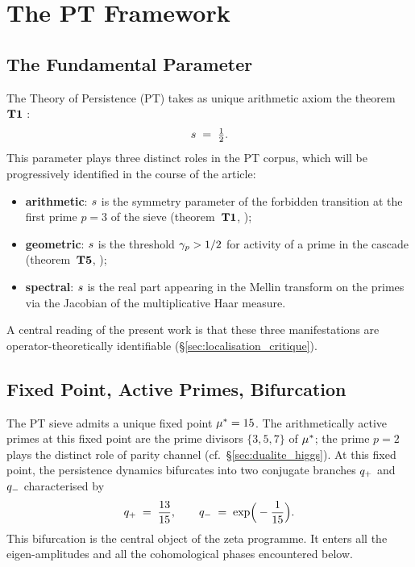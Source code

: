 \section{The PT Framework}
\label{sec:cadre_pt}

\subsection{The Fundamental Parameter}
\label{sec:parametre}

The Theory of Persistence (PT) takes as unique arithmetic axiom the
theorem~$\textbf{T1}$ \cite{PT_M1}:
\[
s \;=\; \tfrac{1}{2}.
\]
This parameter plays three distinct roles in the PT corpus, which will be
progressively identified in the course of the article:
\begin{itemize}[nosep,leftmargin=*]
\item \textbf{arithmetic}: $s$ is the symmetry parameter of the
  forbidden transition at the first prime $p = 3$ of the sieve
  (theorem~$\textbf{T1}$, \cite{PT_M1});
\item \textbf{geometric}: $s$ is the threshold $\gamma_{p} > 1/2$
  for activity of a prime in the cascade
  (theorem~$\textbf{T5}$, \cite{PT_M3});
\item \textbf{spectral}: $s$ is the real part appearing in the
  Mellin transform on the primes via the Jacobian of the multiplicative
  Haar measure.
\end{itemize}

A central reading of the present work is that these three manifestations
are operator-theoretically identifiable (\S\ref{sec:localisation_critique}).

\subsection{Fixed Point, Active Primes, Bifurcation}
\label{sec:point_fixe}

The PT sieve admits a unique fixed point $\mu^{*} = 15$. The
arithmetically active primes at this fixed point are the prime divisors
$\{3, 5, 7\}$ of $\mu^{*}$; the prime $p = 2$ plays the distinct role of
parity channel (cf.~\S\ref{sec:dualite_higgs}). At this fixed point, the
persistence dynamics bifurcates into two conjugate branches $q_{+}$
and $q_{-}$ characterised by
\begin{equation}
q_{+} \;=\; \dfrac{13}{15}, \qquad
q_{-} \;=\; \exp\!\Big(-\dfrac{1}{15}\Big).
\label{eq:qplusqminus}
\end{equation}
This bifurcation is the central object of the zeta programme. It enters
all the eigen-amplitudes and all the cohomological phases encountered
below.

